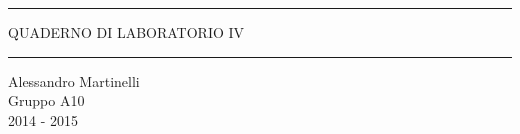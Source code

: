 \begin{titlepage}
\begin{center}

	\hrule \vspace{0.5cm}
     	\textsc{\LARGE QUADERNO DI LABORATORIO IV}
	\vspace{0.5cm} \hrule \vspace{2cm}

      	{\large Alessandro Martinelli\\
		Gruppo A10}\\
	\vspace{0.5cm}
      	{\large 2014 - 2015}
	\vfill



\end{center}
\end{titlepage}
